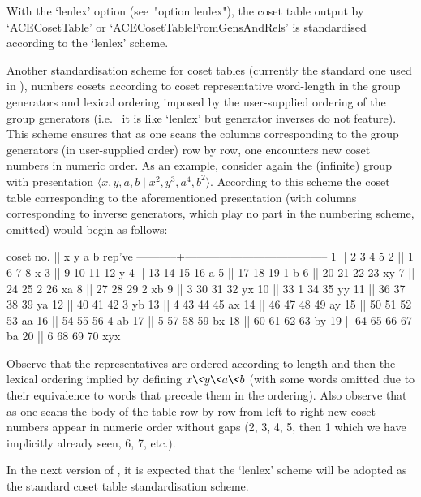 With the `lenlex' option (see~"option lenlex"), the coset table output
by `ACECosetTable' or `ACECosetTableFromGensAndRels'  is  standardised
according to the `lenlex' scheme.

Another  standardisation  scheme  for  coset  tables  (currently   the
standard one used  in  {\GAP}),  numbers  cosets  according  to  coset
representative  word-length  in  the  group  generators  and   lexical
ordering imposed by the user-supplied ordering of the group generators
(i.e.~ it is like `lenlex' but generator  inverses  do  not  feature).
This scheme ensures that as one scans the columns corresponding to the
group generators (in user-supplied order) row by row,  one  encounters
new coset numbers in numeric order. As an example, consider again  the
(infinite) group with presentation $\langle x, y, a, b \mid x^2,  y^3,
a^4,  b^2\rangle$.  According  to  this   scheme   the   coset   table
corresponding  to  the  aforementioned  presentation   (with   columns
corresponding to  inverse  generators,  which  play  no  part  in  the
numbering scheme, omitted) would begin as follows:

\begintt
 coset no. ||      x      y      a      b    rep've
-----------+--------------------------------------
         1 ||      2      3      4      5
         2 ||      1      6      7      8    x
         3 ||      9     10     11     12    y
         4 ||     13     14     15     16    a
         5 ||     17     18     19      1    b
         6 ||     20     21     22     23    xy
         7 ||     24     25      2     26    xa
         8 ||     27     28     29      2    xb
         9 ||      3     30     31     32    yx
        10 ||     33      1     34     35    yy
        11 ||     36     37     38     39    ya
        12 ||     40     41     42      3    yb
        13 ||      4     43     44     45    ax
        14 ||     46     47     48     49    ay
        15 ||     50     51     52     53    aa
        16 ||     54     55     56      4    ab
        17 ||      5     57     58     59    bx
        18 ||     60     61     62     63    by
        19 ||     64     65     66     67    ba
        20 ||      6     68     69     70    xyx
\endtt

Observe that the representatives are ordered according to  length  and
then the lexical ordering implied by defining $x\<y\<a\<b$ (with  some
words omitted due to their equivalence to words that precede  them  in
the ordering). Also observe that as one scans the body  of  the  table
row by row from left to right new  coset  numbers  appear  in  numeric
order without gaps (2, 3, 4,  5,  then  1  which  we  have  implicitly
already seen, 6, 7, etc.).

In the next version of {\GAP}, it is expected that the `lenlex' scheme
will be adopted as the standard  {\GAP}  coset  table  standardisation
scheme.


